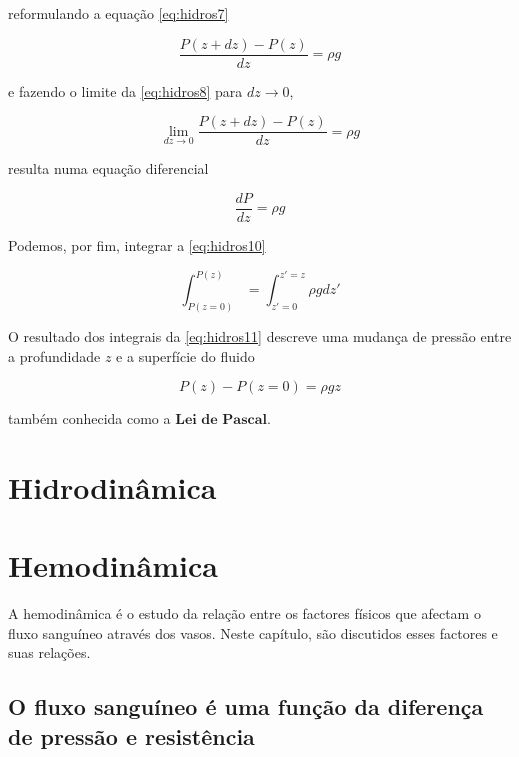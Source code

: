 \documentclass[
  portuguese,
  ]{book}
\begin{document}
reformulando a equação \eqref{eq:hidros7}

\begin{equation}
\frac{P(z+dz)-P(z)}{dz}=\rho g
\label{eq:hidros8}
\end{equation}

e fazendo o limite da \eqref{eq:hidros8} para \(dz\rightarrow 0\),

\begin{equation}
\lim_{dz\rightarrow 0}\frac{P(z+dz)-P(z)}{dz}=\rho g
\label{eq:hidros9}
\end{equation}

resulta numa equação diferencial

\begin{equation}
\frac{dP}{dz}=\rho g
\label{eq:hidros10}
\end{equation}

Podemos, por fim, integrar a \eqref{eq:hidros10}

\begin{equation}
\int^{P(z)}_{P(z=0)}=\int^{z'=z}_{z'=0}\rho g dz'
\label{eq:hidros11}
\end{equation}

O resultado dos integrais da \eqref{eq:hidros11} descreve uma mudança de pressão entre a profundidade \(z\) e a superfície do fluido

\begin{equation}
P(z)-P(z=0)=\rho gz
\label{eq:hidros12}
\end{equation}

também conhecida como a \(\textbf{Lei de Pascal}\).

\hypertarget{hidrodinuxe2mica}{%
\chapter{Hidrodinâmica}\label{hidrodinuxe2mica}}

\hypertarget{hemodinuxe2mica}{%
\chapter{Hemodinâmica}\label{hemodinuxe2mica}}

A hemodinâmica é o estudo da relação entre os factores físicos que afectam o fluxo sanguíneo através dos vasos. Neste capítulo, são discutidos esses factores e suas relações.

\hypertarget{o-fluxo-sanguuxedneo-uxe9-uma-funuxe7uxe3o-da-diferenuxe7a-de-pressuxe3o-e-resistuxeancia}{%
\section{O fluxo sanguíneo é uma função da diferença de pressão e resistência}\label{o-fluxo-sanguuxedneo-uxe9-uma-funuxe7uxe3o-da-diferenuxe7a-de-pressuxe3o-e-resistuxeancia}}
\end{document}
